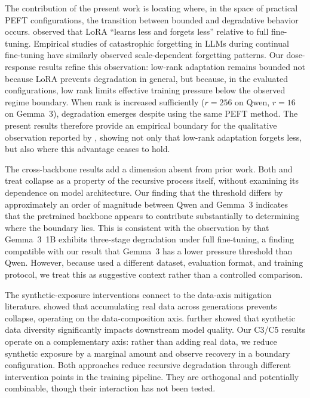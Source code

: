 \documentclass[a4paper,fleqn]{cas-dc}
\begin{document}
The contribution of the present work is locating where, in the space of
practical PEFT configurations, the transition between bounded and degradative
behavior occurs. \citet{biderman2024} observed that LoRA ``learns less and
forgets less'' relative to full fine-tuning. Empirical studies of catastrophic
forgetting in LLMs during continual fine-tuning \citep{luo2023empirical} have
similarly observed scale-dependent forgetting patterns. Our dose-response results
refine
this observation: low-rank adaptation remains bounded not because LoRA prevents
degradation in general, but because, in the evaluated configurations, low rank
limits effective training pressure below the observed regime boundary. When rank
is increased sufficiently ($r=256$ on Qwen, $r=16$ on Gemma~3), degradation
emerges despite using the same PEFT method. The present results therefore
provide an empirical boundary for the qualitative observation reported by
\citet{biderman2024}, showing not only that low-rank adaptation forgets less,
but also where this advantage ceases to hold.

The cross-backbone results add a dimension absent from prior work. Both
\citet{shumailov2024} and \citet{dohmatob2025} treat collapse as a property of
the recursive process itself, without examining its dependence on model
architecture. Our finding that the threshold differs by approximately an order
of magnitude between Qwen and Gemma~3 indicates that the pretrained backbone
appears to contribute substantially to determining where the boundary lies. This
is consistent with the observation by \citet{keisha2025} that Gemma~3~1B
exhibits three-stage degradation under full fine-tuning, a finding compatible
with our result that Gemma~3 has a lower pressure threshold than Qwen. However,
because \citet{keisha2025} used a different dataset, evaluation format, and
training protocol, we treat this as suggestive context rather than a controlled
comparison.

The synthetic-exposure interventions connect to the data-axis mitigation
literature. \citet{gerstgrasser2024} showed that accumulating real data across
generations prevents collapse, operating on the data-composition axis.
\citet{wang2024diversity} further showed that synthetic data diversity
significantly impacts downstream model quality. Our
C3/C5 results operate on a complementary axis: rather than adding real data, we
reduce synthetic exposure by a marginal amount and observe recovery in a
boundary configuration. Both approaches reduce recursive degradation through
different intervention points in the training pipeline. They are orthogonal and
potentially combinable, though their interaction has not been tested.
\end{document}

